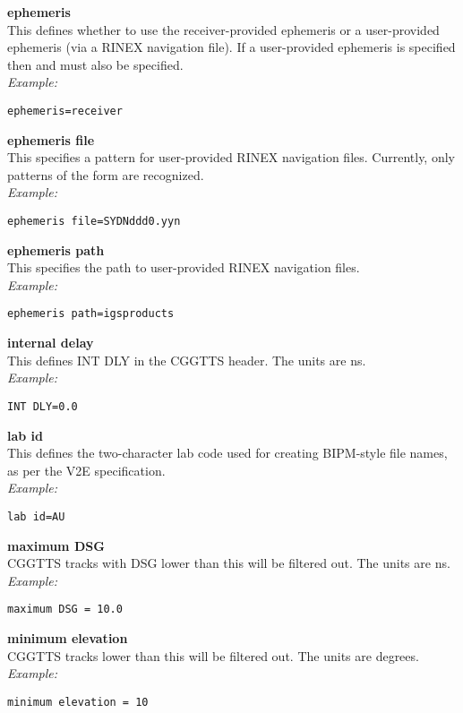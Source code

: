 {\bfseries ephemeris}\\
This defines whether to use the receiver-provided ephemeris or a user-provided ephemeris (via a RINEX navigation file).
If a user-provided ephemeris is specified then  and  
must also be specified.\\
\textit{Example:}
\begin{lstlisting}
ephemeris=receiver
\end{lstlisting}

{\bfseries ephemeris file}\\
This specifies a pattern for user-provided RINEX navigation files.
Currently, only patterns of the form  are recognized.\\
\textit{Example:}
\begin{lstlisting}
ephemeris file=SYDNddd0.yyn
\end{lstlisting}

{\bfseries ephemeris path}\\
This specifies the path to user-provided RINEX navigation files.\\
\textit{Example:}
\begin{lstlisting}
ephemeris path=igsproducts
\end{lstlisting}

{\bfseries internal delay}\\
This defines INT DLY in the CGGTTS header. The units are ns.\\
\textit{Example:}
\begin{lstlisting}
INT DLY=0.0
\end{lstlisting}

{\bfseries lab id}\\
This defines the two-character lab code used for creating BIPM-style file names, as per the V2E specification.\\
\textit{Example:}
\begin{lstlisting}
lab id=AU
\end{lstlisting}

{\bfseries maximum DSG}\\
CGGTTS tracks with DSG lower than this will be filtered out. 
The units are ns.\\
\textit{Example:}
\begin{lstlisting}
maximum DSG = 10.0
\end{lstlisting}

{\bfseries minimum elevation}\\
CGGTTS tracks lower than this will be filtered out. 
The units are degrees.\\
\textit{Example:}
\begin{lstlisting}
minimum elevation = 10
\end{lstlisting}


